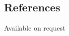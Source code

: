 \documentclass[margin,line,a4paper]{resume}
\begin{document}
\begin{resume}
       	\section{\mysidestyle References}
            Available on request
    \end{resume}
\end{document}
